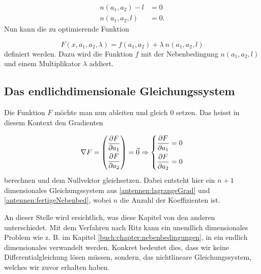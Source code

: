 \begin{equation}
\begin{aligned}
	n(a_1, a_2) - l
	&=
	0
	\\
	n(a_1, a_2, l)
	&=
	0.
\label{antennen:fertigeNebenbed}
\end{aligned}
\end{equation}
Nun kann die zu optimierende Funktion

\begin{equation}
F(x,a_1,a_2,\lambda)
= 
f(a_1,a_2)+\lambda \: n(a_1,a_2, l)
\end{equation}
definiert werden. Dazu wird die Funktion $f$ mit der Nebenbedingung $n(a_1,a_2,l)$ und einem
Multiplikator $\lambda$ addiert.

\subsection{Das endlichdimensionale Gleichungssystem\label{antennen:lagrangeGLsys}}

Die Funktion $F$ möchte man nun ableiten und gleich 0 setzen. Das heisst in diesem Kontext
den Gradienten

\begin{equation}
	\nabla F 
	=
	\begin{pmatrix} 
		\frac{\displaystyle\strut\partial F}{\displaystyle\strut\partial a_1} 
		\\ 
		\frac{\displaystyle\strut\partial F}{\displaystyle\strut\partial a_2}  
	\end{pmatrix} 
	= 
	\vec{0} \Rightarrow
	\left\{
	\begin{aligned}
		\frac{\partial F}{\partial a_1} = 0 \\
		\frac{\partial F}{\partial a_2} = 0
	\end{aligned}
	\right.
	\label{antennen:lagrangeGrad}
\end{equation}
berechnen und dem Nullvektor gleichsetzen. Dabei entsteht hier ein 
$n+1$ dimensionales Gleichungssystem aus \eqref{antennen:lagrangeGrad} und \eqref{antennen:fertigeNebenbed},
wobei $n$ die Anzahl der Koeffizienten ist.

An dieser Stelle wird ersichtlich, was diese Kapitel von den anderen unterschiedet. Mit dem Verfahren nach Ritz  
kann ein unendlich dimensionales
Problem wie z. B. im Kapitel \ref{buch:chapter:nebenbedingungen}, in ein endlich dimensionales verwandelt werden. 
Konkret bedeutet dies, dass wir keine Differentialgleichung lösen müssen, sondern, 
das nichtlineare Gleichungssystem, welches wir zuvor erhalten haben.

